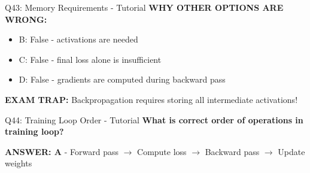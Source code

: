 \documentclass[8pt]{beamer}
\begin{document}
\begin{frame}{Q43: Memory Requirements - Tutorial}
		\vspace{0.05cm}
		\textcolor{myred}{\textbf{WHY OTHER OPTIONS ARE WRONG:}}
		\begin{itemize}
			\item \textcolor{myred}{B:} False - activations are needed
			\item \textcolor{myred}{C:} False - final loss alone is insufficient
			\item \textcolor{myred}{D:} False - gradients are computed during backward pass
		\end{itemize}
		
		\textcolor{myred}{\textbf{EXAM TRAP:}} Backpropagation requires storing \textcolor{myblue}{all intermediate activations}!
	\end{frame}
	
	\begin{frame}{Q44: Training Loop Order - Tutorial}
		\fontsize{6.5}{7.5}\selectfont
		\textbf{What is correct order of operations in training loop?}
		
		\vspace{0.05cm}
		\textcolor{myblue}{\textbf{ANSWER: A}} - Forward pass $\to$ Compute loss $\to$ Backward pass $\to$ Update weights
		

\end{frame}
\end{document}

